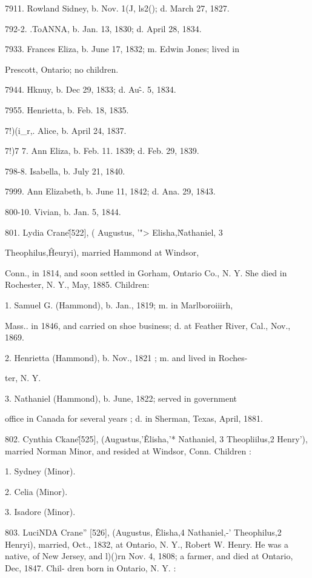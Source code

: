 \documentclass{book}
\begin{document}
7911. Rowland Sidney, b. Nov. 1(J, ls2(); d. March 27, 1827. 

792-2. .ToANNA, b. Jan. 13, 1830; d. April 28, 1834. 

7933. Frances Eliza, b. June 17, 1832; m. Edwin Jones; lived in 

Prescott, Ontario; no children. 

7944. Hknuy, b. Dec 29, 1833; d. Au\^-. 5, 1834. 

7955. Henrietta, b. Feb. 18, 1835. 

7!)(i\_r,. Alice, b. April 24, 1837. 

7!)7 7. Ann Eliza, b. Feb. 11. 1839; d. Feb. 29, 1839. 

798-8. Isabella, b. July 21, 1840. 

7999. Ann Elizabeth, b. June 11, 1842; d. Ana. 29, 1843. 

800-10. Vivian, b. Jan. 5, 1844. 

801. Lydia Crane\^ [522], ( Augustus, '"> Elisha,\^ Nathaniel, 3 

Theophilus,\^ Heuryi), married Hammond at Windsor, 

Conn., in 1814, and soon settled in Gorham, Ontario Co., N. Y. 
She died in Rochester, N. Y., May, 1885. Children: 

1. Samuel G. (Hammond), b. Jan., 1819; m. in Marlboroiiirh, 

Mass.. in 1846, and carried on shoe business; d. at Feather 
River, Cal., Nov., 1869. 

2. Henrietta (Hammond), b. Nov., 1821 ; m. and lived in Roches- 

ter, N. Y. 

3. Nathaniel (Hammond), b. June, 1822; served in government 

office in Canada for several years ; d. in Sherman, Texas, 
April, 1881. 




802. Cynthia Ckane\^ [525], (Augustus,'\^ Elisha,'* Nathaniel, 3 
Theopliilus,2 Henry'), married Norman Minor, and resided at 
Windsor, Conn. Children : 

1. Sydney (Minor). 

2. Celia (Minor). 

3. Isadore (Minor). 

803. LuciNDA Crane'' [526], (Augustus, \^ Elisha,4 Nathaniel,-' 
Theophilus,2 Henryi), married, Oct., 1832, at Ontario, N. Y., 
Robert W. Henry. He was a native, of New Jersey, and l)()rn 
Nov. 4, 1808; a farmer, and died at Ontario, Dec, 1847. Chil- 
dren born in Ontario, N. Y. : 
\end{document}
